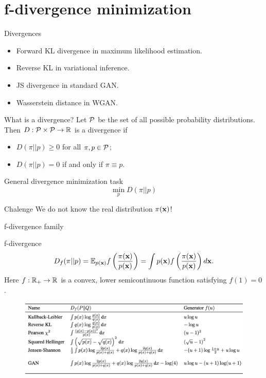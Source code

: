 \section{f-divergence minimization}
\begin{frame}{Divergences}
	\begin{itemize}
		\item Forward KL divergence in maximum likelihood estimation.
		\item Reverse KL in variational inference.
		\item JS divergence in standard GAN.
		\item Wasserstein distance in WGAN.
	\end{itemize}
	\begin{block}{What is a divergence?}
		Let $\mathcal{P}$ be the set of all possible probability distributions. Then $D: \mathcal{P} \times \mathcal{P} \rightarrow \mathbb{R}$ is a divergence if 
		\begin{itemize}
			\item $D(\pi || p) \geq 0$ for all $\pi, p \in \mathcal{P}$;
			\item $D(\pi || p) = 0$ if and only if $\pi \equiv p$.
		\end{itemize}
	\end{block}
	\begin{block}{General divergence minimization task}
		\vspace{-0.3cm}
		\[
			\min_p D(\pi || p)
		\]
		\vspace{-0.7cm}
	\end{block}
	\begin{block}{Chalenge}
		We do not know the real distribution $\pi(\mathbf{x})$!
	\end{block}
\end{frame}
\begin{frame}{f-divergence family}
	
	\begin{block}{f-divergence}
		\vspace{-0.3cm}
		\[
		D_f(\pi || p) = \mathbb{E}_{p(\mathbf{x})}  f\left( \frac{\pi(\mathbf{x})}{p(\mathbf{x})} \right)  = \int p(\mathbf{x}) f\left( \frac{\pi(\mathbf{x})}{p(\mathbf{x})} \right) d \mathbf{x}.
		\]
		Here $f: \mathbb{R}_+ \rightarrow \mathbb{R}$ is a convex, lower semicontinuous function satisfying $f(1) = 0$.
	\end{block}
	\begin{figure}
		\centering
		\includegraphics[width=\linewidth]{figs/f_divs}
	\end{figure}
\end{frame}
